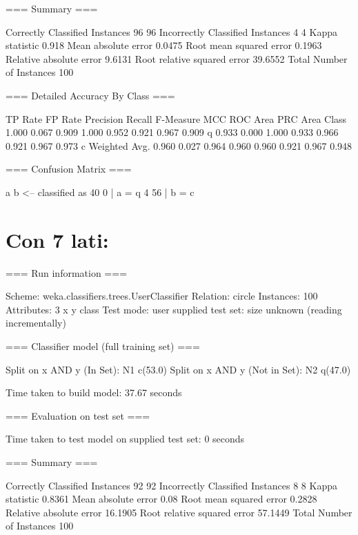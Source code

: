 \documentclass{report}
\begin{document}
	=== Summary ===
	
	Correctly Classified Instances          96               96      %
	Incorrectly Classified Instances         4                4      %
	Kappa statistic                          0.918 
	Mean absolute error                      0.0475
	Root mean squared error                  0.1963
	Relative absolute error                  9.6131 %
	Root relative squared error             39.6552 %
	Total Number of Instances              100     
	
	=== Detailed Accuracy By Class ===
	
	TP Rate  FP Rate  Precision  Recall   F-Measure  MCC      ROC Area  PRC Area  Class
	1.000    0.067    0.909      1.000    0.952      0.921    0.967     0.909     q
	0.933    0.000    1.000      0.933    0.966      0.921    0.967     0.973     c
	Weighted Avg.    0.960    0.027    0.964      0.960    0.960      0.921    0.967     0.948     
	
	=== Confusion Matrix ===
	
	a  b   <-- classified as
	40  0 |  a = q
	4 56 |  b = c
	
	\section{Con 7 lati:}
	=== Run information ===
	
	Scheme:       weka.classifiers.trees.UserClassifier 
	Relation:     circle
	Instances:    100
	Attributes:   3
	x
	y
	class
	Test mode:    user supplied test set:  size unknown (reading incrementally)
	
	=== Classifier model (full training set) ===
	
	
	Split on x AND y (In Set): N1 c(53.0)
	Split on x AND y (Not in Set): N2 q(47.0)
	
	Time taken to build model: 37.67 seconds
	
	=== Evaluation on test set ===
	
	Time taken to test model on supplied test set: 0 seconds
	
	=== Summary ===
	
	Correctly Classified Instances          92               92      %
	Incorrectly Classified Instances         8                8      %
	Kappa statistic                          0.8361
	Mean absolute error                      0.08  
	Root mean squared error                  0.2828
	Relative absolute error                 16.1905 %
	Root relative squared error             57.1449 %
	Total Number of Instances              100     
	
\end{document}
